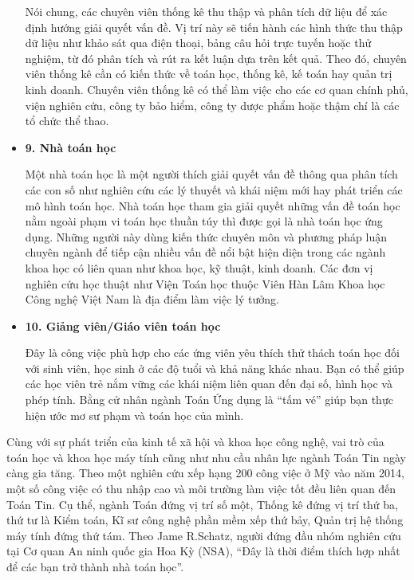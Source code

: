 \documentclass[12pt,a4paper]{report}
\begin{document}
\begin{itemize}
    Nói chung, các chuyên viên thống kê thu thập và phân tích dữ liệu để xác định hướng giải quyết vấn đề. Vị trí này sẽ tiến hành các hình thức thu thập dữ liệu như khảo sát qua điện thoại, bảng câu hỏi trực tuyến hoặc thử nghiệm, từ đó phân tích và rút ra kết luận dựa trên kết quả. Theo đó, chuyên viên thống kê cần có kiến thức về toán học, thống kê, kế toán hay quản trị kinh doanh. Chuyên viên thống kê có thể làm việc cho các cơ quan chính phủ, viện nghiên cứu, công ty bảo hiểm, công ty dược phẩm hoặc thậm chí là các tổ chức thể thao. 
    \item{\bf9. Nhà toán học}
    
    Một nhà toán học là một người thích giải quyết vấn đề thông qua phân tích các con số như nghiên cứu các lý thuyết và khái niệm mới hay phát triển các mô hình toán học. Nhà toán học tham gia giải quyết những vấn đề toán học nằm ngoài phạm vi toán học thuần túy thì được gọi là nhà toán học ứng dụng. Những người này dùng kiến thức chuyên môn và phương pháp luận chuyên ngành để tiếp cận nhiều vấn đề nổi bật hiện diện trong các ngành khoa học có liên quan như khoa học, kỹ thuật, kinh doanh. Các đơn vị nghiên cứu học thuật như Viện Toán học thuộc Viên Hàn Lâm Khoa học Công nghệ Việt Nam là địa điểm làm việc lý tưởng. 
    
    \item{\bf10. Giảng viên/Giáo viên toán học} 
    
    Đây là công việc phù hợp cho các ứng viên yêu thích thử thách toán học đối với sinh viên, học sinh ở các độ tuổi và khả năng khác nhau. Bạn có thể giúp các học viên trẻ nắm vững các khái niệm liên quan đến đại số, hình học và phép tính. Bằng cử nhân ngành Toán Ứng dụng là “tấm vé” giúp bạn thực hiện ước mơ sư phạm và toán học của mình.
    
    
    \end{itemize}
    Cùng với sự phát triển của kinh tế xã hội và khoa học công nghệ, vai trò của toán học và khoa học máy tính cũng như nhu cầu nhân lực ngành Toán Tin ngày càng gia tăng.  Theo một nghiên cứu xếp hạng 200 công việc ở Mỹ  vào năm 2014, một  số công việc có thu nhập cao và môi trường làm việc tốt đều liên quan đến Toán Tin. Cụ thể, ngành Toán đứng vị trí số một, Thống kê  đứng vị trí thứ ba, thứ tư là Kiểm toán, Kĩ sư công nghệ phần mềm xếp thứ bảy, Quản trị hệ thống máy tính đứng thứ tám.  Theo Jame R.Schatz, người đứng đầu nhóm nghiên cứu tại Cơ quan An ninh quốc gia Hoa Kỳ (NSA), “Đây là thời điểm thích hợp nhất để các bạn trở thành nhà toán học”.
    \newpage
\end{document}
